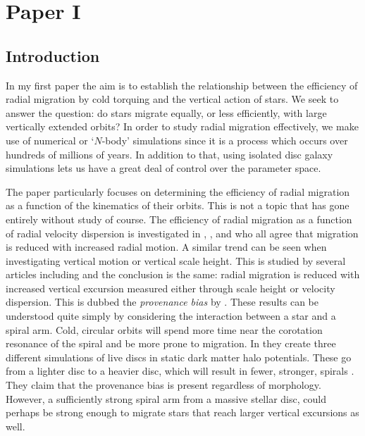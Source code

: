 \chapter{Paper I}\label{chap:paper1}
\section{Introduction}\label{sec:p1-intro}
In my first paper the aim is to establish the relationship between the efficiency of radial migration by cold torquing and the vertical action of stars. We seek to answer the question: do stars migrate equally, or less efficiently, with large vertically extended orbits? In order to study radial migration effectively, we make use of numerical or `$N$-body' simulations since it is a process which occurs over hundreds of millions of years. In addition to that, using isolated disc galaxy simulations lets us have a great deal of control over the parameter space. 

The paper particularly focuses on determining the efficiency of radial migration as a function of the kinematics of their orbits. This is not a topic that has gone entirely without study of course. The efficiency of radial migration as a function of radial velocity dispersion is investigated in \cite{solway:12}, \cite{vera-ciro:14}, and \cite{daniel:18} who all agree that migration is reduced with increased radial motion. A similar trend can be seen when investigating vertical motion or vertical scale height. This is studied by several articles including \cite{solway:12, vera-ciro:14, halle:2015, vera-ciro:16b} and the conclusion is the same: radial migration is reduced with increased vertical excursion measured either through scale height or velocity dispersion. This is dubbed the \textit{provenance bias} by \cite{vera-ciro:14}. These results can be understood quite simply by considering the interaction between a star and a spiral arm. Cold, circular orbits will spend more time near the corotation resonance of the spiral and be more prone to migration. In \cite{vera-ciro:16b} they create three different simulations of live discs in static dark matter halo potentials. These go from a lighter disc to a heavier disc, which will result in fewer, stronger, spirals \citep{donghia:15}. They claim that the provenance bias is present regardless of morphology. However, a sufficiently strong spiral arm from a massive stellar disc, could perhaps be strong enough to migrate stars that reach larger vertical excursions as well. 

